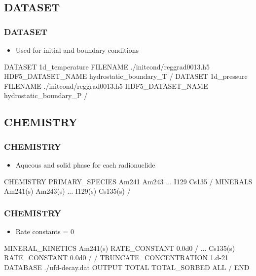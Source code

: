 \documentclass{beamer}
\newcommand\bluecomment[1]{{{\color{blue} #1}}}
\begin{document}
\subsection{DATASET}

\begin{frame}[fragile]\frametitle{DATASET}

\begin{itemize}
  \item Used for initial and boundary conditions
\end{itemize}

\begin{semiverbatim}
DATASET 1d_temperature
  FILENAME ./initcond/reggrad0013.h5
  HDF5_DATASET_NAME hydrostatic_boundary_T
/
DATASET 1d_pressure
  FILENAME ./initcond/reggrad0013.h5
  HDF5_DATASET_NAME hydrostatic_boundary_P
/
\end{semiverbatim}

\end{frame}

\subsection{CHEMISTRY}

\begin{frame}[fragile]\frametitle{CHEMISTRY}

\begin{itemize}
  \item Aqueous and solid phase for each radionuclide
\end{itemize}

\begin{semiverbatim}
CHEMISTRY
  PRIMARY_SPECIES
    Am241
    Am243
    \bluecomment{...}
    I129
    Cs135
  /
  MINERALS
    Am241(s)
    Am243(s)
    \bluecomment{...}
    I129(s)
    Cs135(s)
  /
\end{semiverbatim}

\end{frame}

\begin{frame}[fragile]\frametitle{CHEMISTRY}

\begin{itemize}
  \item Rate constants = 0
\end{itemize}

\begin{semiverbatim}\small
  MINERAL_KINETICS
    Am241(s)
      RATE_CONSTANT 0.0d0
    /
    \bluecomment{...}
    Cs135(s)
      RATE_CONSTANT 0.0d0
    /
  /
  TRUNCATE_CONCENTRATION 1.d-21
  DATABASE ./ufd-decay.dat
  OUTPUT
    TOTAL
    TOTAL_SORBED
    ALL
  /
END
\end{semiverbatim}

\end{frame}
\end{document}
